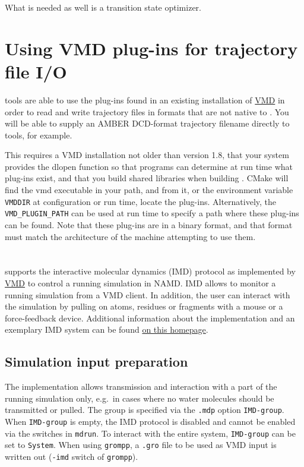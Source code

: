 What is needed as well is a transition state optimizer.

\section{Using VMD plug-ins for trajectory file I/O}
 tools are able
to use the plug-ins found in an existing installation of
\href{http://www.ks.uiuc.edu/Research/vmd}{VMD} in order to read and
write trajectory files in formats that are not native to
{\gromacs}. You will be able to supply an AMBER DCD-format trajectory
filename directly to {\gromacs} tools, for example.

This requires a VMD installation not older than version 1.8, that your
system provides the dlopen function so that programs can determine at
run time what plug-ins exist, and that you build shared libraries when
building {\gromacs}. CMake will find the vmd executable in your path, and
from it, or the environment variable {\tt VMDDIR} at configuration or
run time, locate the plug-ins. Alternatively, the {\tt VMD_PLUGIN_PATH}
can be used at run time to specify a path where these plug-ins can be
found. Note that these plug-ins are in a binary format, and that format
must match the architecture of the machine attempting to use them.


\section{}
{\gromacs} supports the interactive molecular dynamics (IMD) protocol as implemented
by \href{http://www.ks.uiuc.edu/Research/vmd}{VMD} to control a running simulation
in NAMD. IMD allows to monitor a running {\gromacs} simulation from a VMD client.
In addition, the user can interact with the simulation by pulling on atoms, residues
or fragments with a mouse or a force-feedback device. Additional information about
the {\gromacs} implementation and an exemplary {\gromacs} IMD system can be found
\href{http://www.mpibpc.mpg.de/grubmueller/interactivemd}{on this homepage}.

\subsection{Simulation input preparation}
The {\gromacs} implementation allows transmission and interaction with a part of the
running simulation only, e.g.\ in cases where no water molecules should be transmitted
or pulled. The group is specified via the {\tt .mdp} option {\tt IMD-group}. When
{\tt IMD-group} is empty, the IMD protocol is disabled and cannot be enabled via the
switches in {\tt mdrun}. To interact with the entire system, {\tt IMD-group} can
be set to {\tt System}. When using {\tt grompp}, a {\tt .gro} file
to be used as VMD input is written out ({\tt -imd} switch of {\tt grompp}).

